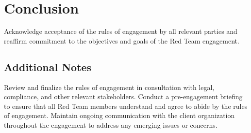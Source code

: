 \section*{Conclusion}

Acknowledge acceptance of the rules of engagement by all relevant parties and reaffirm commitment to the objectives and goals of the Red Team engagement.

\subsection*{Additional Notes}
Review and finalize the rules of engagement in consultation with legal, compliance, and other relevant stakeholders.
Conduct a pre-engagement briefing to ensure that all Red Team members understand and agree to abide by the rules of engagement.
Maintain ongoing communication with the client organization throughout the engagement to address any emerging issues or concerns.
